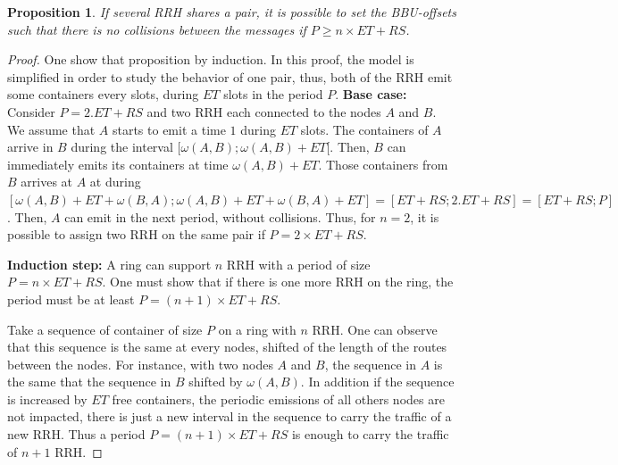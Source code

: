 \documentclass[]{algotel}
\newtheorem{prop}{Proposition}
\begin{document}
\begin{prop}
 If several RRH shares a pair, it is possible to set the BBU-offsets such that there is no collisions between the messages if $P \ge n\times ET + RS$.
 \end{prop}
 \begin{proof}
One show that proposition by induction.
 In this proof, the model is simplified in order to study the behavior of one pair, thus, both of the RRH emit some containers every slots, during $ET$ slots in the period $P$.
 {\bf Base case:} 
 Consider $P =  2.ET+RS$ and two RRH each connected to the nodes $A$ and $B$.
 We assume that $A$ starts to emit a time $1$ during $ET$ slots. The containers of $A$ arrive in $B$ during the interval $[\omega(A,B);\omega(A,B)+ET[$. Then, $B$ can immediately emits its containers at time $\omega(A,B)+ET$. Those containers from $B$ arrives at $A$ at during  $ [\omega(A,B)+ET + \omega(B,A) ;\omega(A,B)+ET + \omega(B,A) + ET ] = [ET+RS;2.ET+RS] = [ET + RS; P]$. Then, $A$ can emit in the next period, without collisions.
Thus, for $n = 2$, it is possible to assign two RRH on the same pair if $P = 2\times ET + RS$.
 
 {\bf Induction step:}  A ring can support $n$ RRH with a period of size $P= n\times ET + RS$. One must show that if there is one more RRH on the ring, the period must be at least $P = (n+1)\times ET + RS$. 
 
Take a sequence of container of size $P$ on a ring with $n$ RRH. One can observe that this sequence is the same at every nodes, shifted of the length of the routes between the nodes. For instance, with two nodes $A$ and $B$, the sequence in $A$ is the same that the sequence in $B$ shifted by $\omega(A,B)$.
In addition if the sequence is increased by $ET$ free containers, the periodic emissions of all others nodes are not impacted, there is just a new interval in the sequence to carry the traffic of a new RRH. Thus a period $P = (n+1)\times ET + RS$ is enough to carry the traffic of $n+1$ RRH.
 \end{proof}
\end{document}
